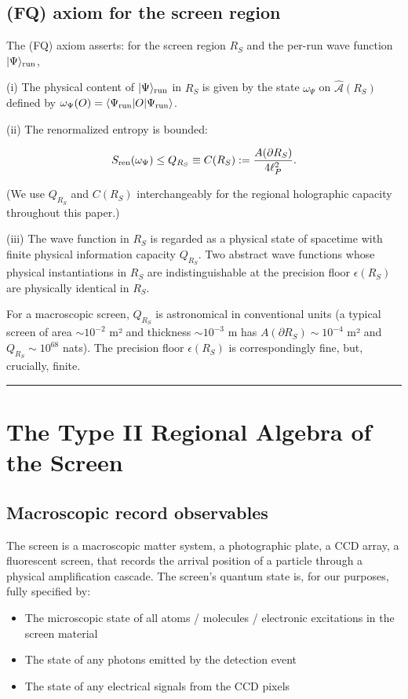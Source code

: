 \documentclass[11pt,a4paper]{article}
\begin{document}
\subsection{(FQ) axiom for the screen region}

The (FQ) axiom asserts: for the screen region $R_S$ and the per-run wave function $|\Psi\rangle_{\rm run}$,

(i) The physical content of $|\Psi\rangle_{\rm run}$ in $R_S$ is given by the state $\omega_\Psi$ on $\hat{\mathcal{A}}(R_S)$ defined by $\omega_\Psi(O) = \langle\Psi_{\rm run}|O|\Psi_{\rm run}\rangle$.

(ii) The renormalized entropy is bounded:

\[
S_{\rm ren}(\omega_\Psi) \le Q_{R_S} \equiv C(R_S) := \frac{A(\partial R_S)}{4\ell_P^2}.
\]

(We use $Q_{R_S}$ and $C(R_S)$ interchangeably for the regional holographic capacity throughout this paper.)

(iii) The wave function in $R_S$ is regarded as a physical state of spacetime with finite physical information capacity $Q_{R_S}$. Two abstract wave functions whose physical instantiations in $R_S$ are indistinguishable at the precision floor $\epsilon(R_S)$ are physically identical in $R_S$.

For a macroscopic screen, $Q_{R_S}$ is astronomical in conventional units (a typical screen of area $\sim 10^{-2}$ m² and thickness $\sim 10^{-3}$ m has $A(\partial R_S) \sim 10^{-4}$ m² and $Q_{R_S} \sim 10^{68}$ nats). The precision floor $\epsilon(R_S)$ is correspondingly fine, but, crucially, finite.

\medskip\hrule\medskip

\section{The Type II Regional Algebra of the Screen}

\subsection{Macroscopic record observables}

The screen is a macroscopic matter system, a photographic plate, a CCD array, a fluorescent screen, that records the arrival position of a particle through a physical amplification cascade. The screen's quantum state is, for our purposes, fully specified by:
\begin{itemize}
  \item The microscopic state of all atoms / molecules / electronic excitations in the screen material
  \item The state of any photons emitted by the detection event
  \item The state of any electrical signals from the CCD pixels
\end{itemize}
\end{document}
